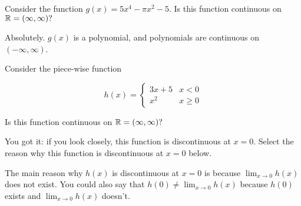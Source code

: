 \documentclass[handout]{ximera}
\begin{document}
\begin{exercise}

Consider the function $g(x) = 5x^4 - \pi x^2 - 5.$  Is this function continuous on $\mathbb R = (\infty, \infty)?$  

\begin{multipleChoice}
\end{multipleChoice}

\begin{feedback}[correct]

Absolutely.  $g(x)$ is a polynomial, and polynomials are continuous on $(-\infty, \infty)$.

\end{feedback}

\end{exercise}

\begin{exercise}
Consider the piece-wise function 

\[
h(x) = \begin{cases}
  3x+5  & x<0 \\
  x^2 & x \geq 0
\end{cases}
\]

Is this function continuous on $\mathbb R = (\infty, \infty)?$  

\begin{multipleChoice}
\end{multipleChoice}

\begin{exercise}

You got it: if you look closely, this function is discontinuous at $x=0$.  Select the reason why this function is discontinuous at $x=0$ below.  

\begin{multipleChoice}
    
\begin{feedback}[correct]
The main reason why $h(x)$ is discontinuous at $x=0$ is because $\displaystyle\lim_{x \to 0} h(x)$ does not exist.  You could also say that $h(0) \neq \displaystyle\lim_{x \to 0} h(x)$ because $h(0)$ exists and $\displaystyle\lim_{x \to 0} h(x)$ doesn't.
\end{feedback}

\end{multipleChoice}
\end{exercise}
\end{exercise}
\end{document}
